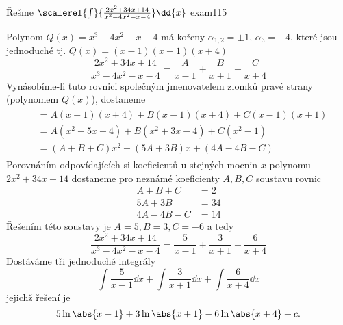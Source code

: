 \begin{mathexam}{Řešme \(\protect\scalerel{\int}{\frac{2x^2+34x+14}{x^3-4x^2-x-4}}\dd{x}\)
  \hfill\cite[s.~90]{Knichal}}{exam115}
    
    Polynom $Q(x)=x^3-4x^2-x-4$ má kořeny $\alpha_{1,2}=\pm1$, $\alpha_{3}=-4$, které jsou
    jednoduché tj. $Q(x)=(x-1)(x+1)(x+4)$ $$\frac{2x^2+34x+14}{x^3-4x^2-x-4} =
    \frac{A}{x-1}+\frac{B}{x+1}+\frac{C}{x+4}$$ Vynásobíme-li tuto rovnici společným jmenovatelem
    zlomků pravé strany (polynomem $Q(x)$), dostaneme
    \begin{gather*}
        \begin{align*}
          &= A(x+1)(x+4) + B(x-1)(x+4) + C(x-1)(x+1) \\
          &= A(x^2+5x+4) + B(x^2+3x-4) + C(x^2-1)    \\
          &= (A+B+C)x^2  + (5A+3B)x    + (4A-4B-C)
        \end{align*}
    \end{gather*}
    Porovnáním odpovídajících si koeficientů u stejných mocnin $x$ polynomu \(2x^2+34x+14\)
    dostaneme pro nez\-ná\-mé koeficienty $A, B, C$ soustavu rovnic
    \begin{align*}
       A+   B + C &= 2 \\
      5A + 3B     &= 34 \\
      4A - 4B - C &= 14
    \end{align*}
    Řešením této soustavy je $A = 5, B = 3, C = -6$ a tedy
    $$\frac{2x^2+34x+14}{x^3-4x^2-x-4} = \frac{5}{x-1}+\frac{3}{x+1}-\frac{6}{x+4}$$
    Dostáváme tři jednoduché integrály
    \begin{equation*}
      \int{\frac{5}{x-1}}\dd{x} + \int{\frac{3}{x+1}}\dd{x} + \int{\frac{6}{x+4}}\dd{x}            
    \end{equation*}
    jejichž řešení je 
    \begin{equation*}
      5\ln\abs{x-1} +  3\ln\abs{x+1} - 6\ln\abs{x+4} +c.
    \end{equation*}
\end{mathexam}